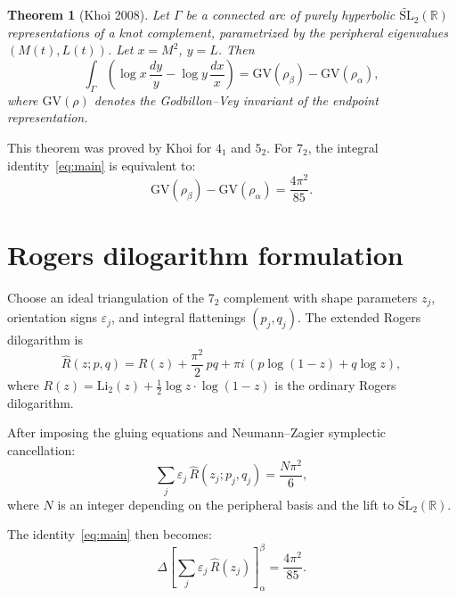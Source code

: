 \documentclass[11pt]{article}
\newtheorem{theorem}{Theorem}
\theoremstyle{remark}
\begin{document}
\begin{theorem}[Khoi 2008]\label{thm:khoi}
Let $\Gamma$ be a connected arc of purely hyperbolic
$\widetilde{\mathrm{SL}}_2(\mathbb{R})$ representations of a
knot complement, parametrized by the peripheral eigenvalues
$(M(t), L(t))$.  Let $x = M^2$, $y = L$.  Then
\begin{equation}\label{eq:variation}
\int_\Gamma
\left(\log x \,\frac{dy}{y} - \log y \,\frac{dx}{x}\right)
= \mathrm{GV}(\rho_\beta) - \mathrm{GV}(\rho_\alpha),
\end{equation}
where $\mathrm{GV}(\rho)$ denotes the Godbillon--Vey invariant
of the endpoint representation.
\end{theorem}

This theorem was proved by Khoi for $4_1$ and $5_2$.  For $7_2$,
the integral identity~\eqref{eq:main} is equivalent to:
\begin{equation}\label{eq:gv-target}
\mathrm{GV}(\rho_\beta) - \mathrm{GV}(\rho_\alpha)
= \frac{4\pi^2}{85}.
\end{equation}

\section{Rogers dilogarithm formulation}

Choose an ideal triangulation of the $7_2$ complement with shape
parameters $z_j$, orientation signs $\varepsilon_j$, and integral
flattenings $(p_j, q_j)$.  The extended Rogers dilogarithm is
\begin{equation}\label{eq:rogers}
\hat{R}(z; p, q) = R(z) + \frac{\pi^2}{2}\,pq
+ \pi i\,(p \log(1-z) + q \log z),
\end{equation}
where $R(z) = \mathrm{Li}_2(z) + \frac{1}{2}\log z \cdot
\log(1-z)$ is the ordinary Rogers dilogarithm.

After imposing the gluing equations and Neumann--Zagier symplectic
cancellation:
\begin{equation}\label{eq:neumann}
\sum_j \varepsilon_j\, \hat{R}(z_j; p_j, q_j)
= \frac{N\pi^2}{6},
\end{equation}
where $N$ is an integer depending on the peripheral basis and
the lift to $\widetilde{\mathrm{SL}}_2(\mathbb{R})$.

The identity~\eqref{eq:main} then becomes:
\begin{equation}\label{eq:dilog-target}
\Delta\!\left[\sum_j \varepsilon_j\, \hat{R}(z_j)\right]_{\alpha}^{\beta}
= \frac{4\pi^2}{85}.
\end{equation}
\end{document}
